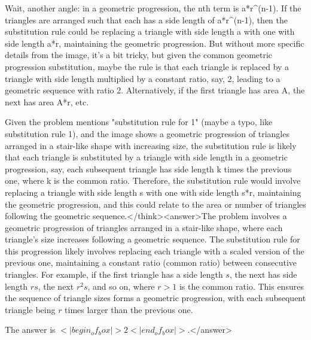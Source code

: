 Wait, another angle: in a geometric progression, the nth term is a*r^(n-1). If the triangles are arranged such that each has a side length of a*r^(n-1), then the substitution rule could be replacing a triangle with side length a with one with side length a*r, maintaining the geometric progression. But without more specific details from the image, it's a bit tricky, but given the common geometric progression substitution, maybe the rule is that each triangle is replaced by a triangle with side length multiplied by a constant ratio, say, 2, leading to a geometric sequence with ratio 2. Alternatively, if the first triangle has area A, the next has area A*r, etc. 

Given the problem mentions "substitution rule for 1" (maybe a typo, like substitution rule 1), and the image shows a geometric progression of triangles arranged in a stair-like shape with increasing size, the substitution rule is likely that each triangle is substituted by a triangle with side length in a geometric progression, say, each subsequent triangle has side length k times the previous one, where k is the common ratio. Therefore, the substitution rule would involve replacing a triangle with side length s with one with side length s*r, maintaining the geometric progression, and this could relate to the area or number of triangles following the geometric sequence.</think><answer>The problem involves a geometric progression of triangles arranged in a stair-like shape, where each triangle's size increases following a geometric sequence. The substitution rule for this progression likely involves replacing each triangle with a scaled version of the previous one, maintaining a constant ratio (common ratio) between consecutive triangles. For example, if the first triangle has a side length \( s \), the next has side length \( rs \), the next \( r^2s \), and so on, where \( r > 1 \) is the common ratio. This ensures the sequence of triangle sizes forms a geometric progression, with each subsequent triangle being \( r \) times larger than the previous one.  

The answer is \(<|begin_of_box|>2<|end_of_box|>\).</answer>